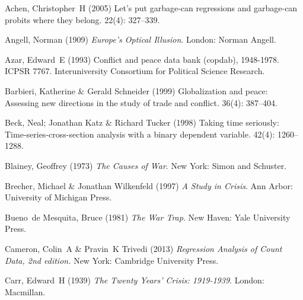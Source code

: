 \documentclass[12pt]{article}
\theoremstyle{hypothesis}
\begin{document}
\begin{thebibliography}{}

Achen, Christopher~H (2005) Let's put garbage-can regressions and garbage-can
  probits where they belong.
 { 22\/}(4): 327--339.

Angell, Norman (1909) {\em {E}urope's {O}ptical {I}llusion}.
\newblock London: Norman Angell.

Azar, Edward~E (1993) Conflict and peace data bank (copdab), 1948-1978.
\newblock ICPSR 7767. Interuniversity Consortium for Political Science
  Research.

Barbieri, Katherine  \& Gerald Schneider (1999) Globalization and peace:
  Assessing new directions in the study of trade and conflict.
 { 36\/}(4): 387--404.

Beck, Neal; Jonathan Katz  \& Richard Tucker (1998) Taking time seriously:
  Time-series-cross-section analysis with a binary dependent variable.
 { 42\/}(4): 1260--1288.

Blainey, Geoffrey (1973) {\em The Causes of War}.
\newblock New York: Simon and Schuster.

Brecher, Michael  \& Jonathan Wilkenfeld (1997) {\em A Study in Crisis}.
\newblock Ann Arbor: University of Michigan Press.

Bueno~de Mesquita, Bruce (1981) {\em The War Trap}.
\newblock New Haven: Yale University Press.

Cameron, Colin~A  \& Pravin~K Trivedi (2013) {\em { Regression Analysis of
  Count Data\/}, 2nd edition.}
\newblock New York: Cambridge University Press.

Carr, Edward~H (1939) {\em The Twenty Years' Crisis: 1919-1939}.
\newblock London: Macmillan.


\end{thebibliography}
\end{document}
